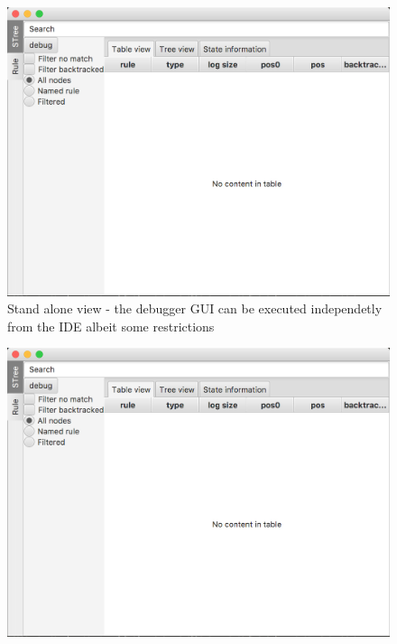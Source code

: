 		\begin{figure}[h]
			\includegraphics[width=1\textwidth] {ressources/stand_alone}
			\caption{Stand alone view - the debugger GUI can be executed independetly from the IDE albeit some restrictions} 
			\label{fig:stand_alone}
		\end{figure}


		\begin{figure}[h]
			\includegraphics[width=1\textwidth] {ressources/stand_alone}
		\end{figure}



